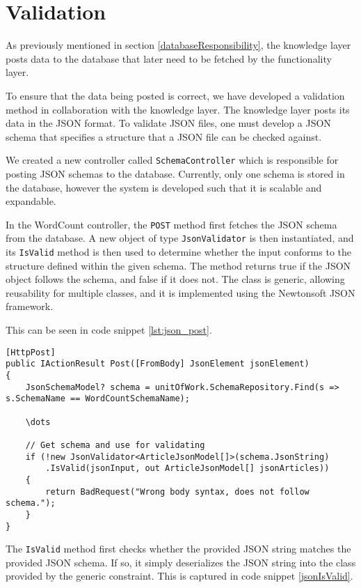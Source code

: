 \section{Validation}

As previously mentioned in section \ref{databaseResponsibility}, the knowledge layer posts data to the database that later need to be fetched by the functionality layer.

To ensure that the data being posted is correct, we have developed a validation method in collaboration with the knowledge layer.
The knowledge layer posts its data in the JSON format. 
To validate JSON files, one must develop a JSON schema that specifies a structure that a JSON file can be checked against.

We created a new controller called \texttt{SchemaController} which is responsible for posting JSON schemas to the database. 
Currently, only one schema is stored in the database, however the system is developed such that it is scalable and expandable.

In the WordCount controller, the \texttt{POST} method first fetches the JSON schema from the database.
A new object of type \texttt{JsonValidator} is then instantiated, and its \texttt{IsValid} method is then used to determine whether the input conforms to the structure defined within the given schema. 
The method returns true if the JSON object follows the schema, and false if it does not.
The class is generic, allowing reusability for multiple classes, and it is implemented using the Newtonsoft JSON framework. 

This can be seen in code snippet \ref{lst:json_post}.

\begin{lstlisting}[language=CSharp, caption={Snippet from the \texttt{POST} method showing validation of the input JSON.}, label={lst:json_post}]
[HttpPost]
public IActionResult Post([FromBody] JsonElement jsonElement)
{
	JsonSchemaModel? schema = unitOfWork.SchemaRepository.Find(s => s.SchemaName == WordCountSchemaName);
	
	\dots

	// Get schema and use for validating
	if (!new JsonValidator<ArticleJsonModel[]>(schema.JsonString)
		.IsValid(jsonInput, out ArticleJsonModel[] jsonArticles))
	{
		return BadRequest("Wrong body syntax, does not follow schema.");
	}
}
\end{lstlisting}

The \texttt{IsValid} method first checks whether the provided JSON string matches the provided JSON schema.
If so, it simply deserializes the JSON string into the class provided by the generic constraint.
This is captured in code snippet \ref{jsonIsValid}.

